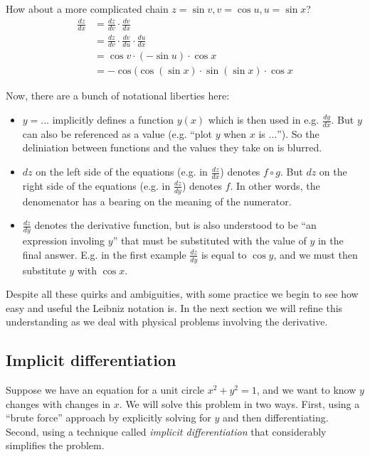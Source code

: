 How about a more complicated chain $z=\sin v, v=\cos u, u=\sin x$?
\begin{align*}
  \frac{dz}{dx}&=\frac{dz}{dv}\cdot \frac{dv}{dx}\\
               &=\frac{dz}{dv}\cdot \frac{dv}{du}\cdot \frac{du}{dx}\\
               &=\cos v \cdot (-\sin u)\cdot \cos x\\
               &=-\cos(\cos (\sin x)\cdot\sin (\sin x)\cdot \cos x
\end{align*}

Now, there are a bunch of notational liberties here:
\begin{itemize}
\item $y=\ldots$ implicitly defines a function $y(x)$ which is then used in
  e.g. $\frac{dy}{dx}$. But $y$ can also be referenced as a value
  (e.g. ``plot $y$ when $x$ is $\ldots$''). So the deliniation between
  functions and the values they take on is blurred.
\item $dz$ on the left side of the equations (e.g. in $\frac{dz}{dx}$)
  denotes $f\circ g$. But $dz$ on the right side of the equations (e.g. in
  $\frac{dz}{dy}$) denotes $f$. In other words, the denomenator has a
  bearing on the meaning of the numerator.
\item $\frac{dz}{dy}$ denotes the derivative function, but is also
  understood to be ``an expression involing $y$'' that must be
  substituted with the value of $y$ in the final answer. E.g. in the
  first example $\frac{dz}{dy}$ is equal to $\cos y$, and we must then
  substitute $y$ with $\cos x$.
\end{itemize}

Despite all these quirks and ambiguities, with some practice we begin
to see how easy and useful the Leibniz notation is. In the next
section we will refine this understanding as we deal with physical
problems involving the derivative.

\subsection{Implicit differentiation}
Suppose we have an equation for a unit circle $x^2+y^2=1$, and we want
to know $y$ changes with changes in $x$. We will solve this problem in
two ways. First, using a ``brute force'' approach by explicitly
solving for $y$ and then differentiating. Second, using a technique
called \textit{implicit differentiation} that considerably simplifies
the problem.

